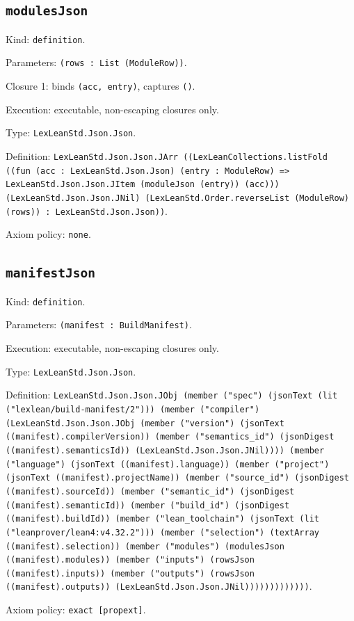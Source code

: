 \documentclass[11pt]{article}
\begin{document}
\subsection*{\texttt{modulesJson}}
\noindent Kind: \texttt{definition}.\par
\noindent Parameters: \texttt{(rows : List (ModuleRow))}.\par
\noindent Closure 1: binds \texttt{(acc, entry)}, captures \texttt{()}.\par
\noindent Execution: executable, non-escaping closures only.\par
\noindent Type: \texttt{LexLeanStd.Json.Json}.\par
\noindent Definition: \texttt{LexLeanStd.Json.Json.JArr ((LexLeanCollections.listFold ((fun (acc : LexLeanStd.Json.Json) (entry : ModuleRow) => LexLeanStd.Json.Json.JItem (moduleJson (entry)) (acc))) (LexLeanStd.Json.Json.JNil) (LexLeanStd.Order.reverseList (ModuleRow) (rows)) : LexLeanStd.Json.Json))}.\par
\noindent Axiom policy: \texttt{none}.\par
\subsection*{\texttt{manifestJson}}
\noindent Kind: \texttt{definition}.\par
\noindent Parameters: \texttt{(manifest : BuildManifest)}.\par
\noindent Execution: executable, non-escaping closures only.\par
\noindent Type: \texttt{LexLeanStd.Json.Json}.\par
\noindent Definition: \texttt{LexLeanStd.Json.Json.JObj (member ("spec") (jsonText (lit ("lexlean/build-manifest/2"))) (member ("compiler") (LexLeanStd.Json.Json.JObj (member ("version") (jsonText ((manifest).compilerVersion)) (member ("semantics\_id") (jsonDigest ((manifest).semanticsId)) (LexLeanStd.Json.Json.JNil)))) (member ("language") (jsonText ((manifest).language)) (member ("project") (jsonText ((manifest).projectName)) (member ("source\_id") (jsonDigest ((manifest).sourceId)) (member ("semantic\_id") (jsonDigest ((manifest).semanticId)) (member ("build\_id") (jsonDigest ((manifest).buildId)) (member ("lean\_toolchain") (jsonText (lit ("leanprover/lean4:v4.32.2"))) (member ("selection") (textArray ((manifest).selection)) (member ("modules") (modulesJson ((manifest).modules)) (member ("inputs") (rowsJson ((manifest).inputs)) (member ("outputs") (rowsJson ((manifest).outputs)) (LexLeanStd.Json.Json.JNil)))))))))))))}.\par
\noindent Axiom policy: \texttt{exact [propext]}.\par
\end{document}
